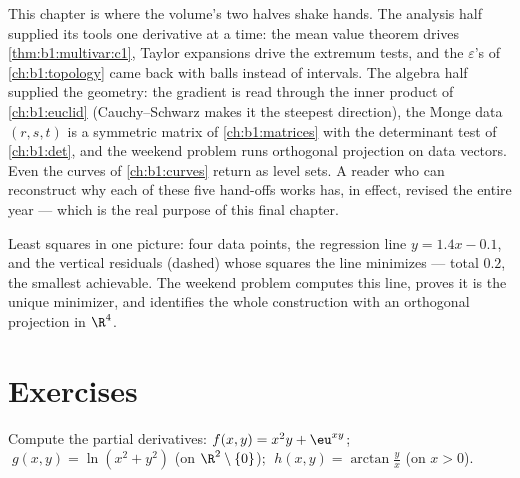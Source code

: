 \begin{remark}
\label{rem:b1:multivar:perspectives}
This chapter is where the volume's two halves shake hands. The
analysis half supplied its tools one derivative at a time: the
mean value theorem drives \cref{thm:b1:multivar:c1}, Taylor
expansions drive the extremum tests, and the $\varepsilon$'s of
\cref{ch:b1:topology} came back with balls instead of
intervals. The algebra half supplied the geometry: the gradient
is read through the inner product of \cref{ch:b1:euclid}
(Cauchy--Schwarz makes it the steepest direction), the Monge
data $(r, s, t)$ is a symmetric matrix of
\cref{ch:b1:matrices} with the determinant test of
\cref{ch:b1:det}, and the weekend problem runs orthogonal
projection on data vectors. Even the curves of
\cref{ch:b1:curves} return as level sets. A reader who can
reconstruct why each of these five hand-offs works has, in
effect, revised the entire year --- which is the real purpose
of this final chapter.
\end{remark}

\begin{omfigure}

{\small Least squares in one picture: four data points, the
regression line $y = 1.4x - 0.1$, and the vertical residuals
(dashed) whose squares the line minimizes --- total $0.2$, the
smallest achievable. The weekend problem computes this line,
proves it is the unique minimizer, and identifies the whole
construction with an orthogonal projection in $\R^4$.}
\end{omfigure}

\section{Exercises}

\begin{exercise}[$\star$]\label{exo:b1:multivar:1}
Compute the partial derivatives:
$f(x,y) = x^2 y + \eu^{xy}$; $\;g(x,y) = \ln(x^2 + y^2)$ (on
$\R^2\setminus\{0\}$); $\;h(x,y) = \arctan\frac yx$ (on $x > 0$).
\end{exercise}

